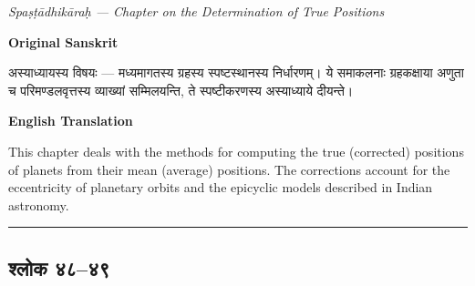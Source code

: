 \documentclass[11pt,a4paper]{article}
\newcommand{\longline}{\noindent\rule{\textwidth}{0.4pt}}
\newcommand{\dev}[1]{{\devanagarifont #1}}
\newcommand{\sectsep}{\par\vspace{0.8em}\longline\vspace{0.8em}}
\begin{document}
\begin{center}
\textit{Spa\d{s}\d{t}\=adhik\=ara\d{h} --- Chapter on the Determination of True Positions}
\end{center}

\begin{minipage}[t]{0.48\textwidth}
\textbf{\small Original Sanskrit}

\small\devanagarifont
अस्याध्यायस्य विषयः --- मध्यमागतस्य ग्रहस्य स्पष्टस्थानस्य निर्धारणम्। ये समाकलनाः ग्रहकक्षाया अणुता च परिमण्डलवृत्तस्य व्याख्यां सम्मिलयन्ति, ते स्पष्टीकरणस्य अस्याध्याये दीयन्ते।
\end{minipage}%
\hfill
\begin{minipage}[t]{0.48\textwidth}
\textbf{\small English Translation}

This chapter deals with the methods for computing the true (corrected) positions of planets from their mean (average) positions. The corrections account for the eccentricity of planetary orbits and the epicyclic models described in Indian astronomy.
\end{minipage}

\sectsep

\subsection{\dev{श्लोक ४८--४९}}
\label{subsec:48-49}
\end{document}

